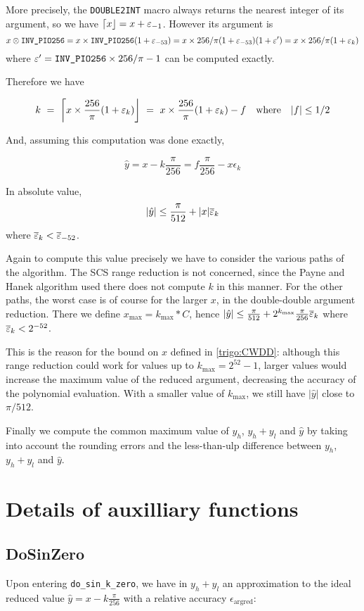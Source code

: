 More precisely, the \texttt{DOUBLE2INT} macro always returns the
nearest integer of its argument, so we have
$\left\lceil x \right\rfloor=x+\varepsilon_{-1}$. However its argument is
$$x\otimes\verb!INV_PIO256! = x \times
\verb!INV_PIO256!(1+\epsilon_{-53}) = x\times
256/\pi(1+\epsilon_{-53})(1+\epsilon')  = x\times
256/\pi(1+\epsilon_k)$$
where $\epsilon'=\verb!INV_PIO256!\times256/\pi-1$ can be
computed exactly.

Therefore we have 

$$k\ =\ \left\lceil x\times \frac{256}{\pi}(1+\varepsilon_k) \right\rfloor
\ =\ x\times \frac{256}{\pi}(1+\varepsilon_k) - f \quad\mbox{where} \quad |f|\le 1/2
$$

And, assuming this computation was done exactly,

$$\hat{y}=x-k\frac{\pi}{256} = f\frac{\pi}{256} - x\epsilon_k$$

In absolute value, $$\left|\hat{y}\right| \le \frac{\pi}{512} +
|x|{\overline{\varepsilon}}_k$$
where ${\overline{\varepsilon}}_k<{\overline{\varepsilon}}_{-52}$.

Again to compute this value precisely we have to consider the various
paths of the algorithm. The SCS range reduction is not concerned,
since the Payne and Hanek algorithm used there does not compute $k$ in
this manner. For the other paths, the worst case is of course for the
larger $x$, in the double-double argument reduction. There we define
$x_{\max} = k_{\max}*C$, hence  $\left|\hat{y}\right|
\le \frac{\pi}{512} + 2^{k_{\max}}\frac{\pi}{256}{\overline{\varepsilon}}_k$ where
${\overline{\varepsilon}}_k<2^{-52}$.


This is the reason for the bound on $x$ defined in \ref{trigo:CWDD}:
although this range reduction could work for values up to
$k_{\max}=2^{52}-1$, larger values would increase the maximum
value of the reduced argument, decreasing the accuracy of the
polynomial evaluation. With a smaller value of $k_{\max}$, we still have
$\left|\hat{y}\right|$ close to $\pi/512$. 

Finally we compute the common maximum value of $y_h$, $y_h+y_l$ and
$\widehat{y}$ by taking into account the rounding errors and the
less-than-ulp difference between $y_h$, $y_h+y_l$ and $\widehat{y}$.
 



\section{Details of auxilliary functions
  \label{trigo:auxilliary}}

\subsection{DoSinZero \label{dosinzero}}
Upon entering  \texttt{do\_sin\_k\_zero}, we have in
$y_h+y_l$ an approximation to the ideal reduced value
$\hat{y}=x-k\frac{\pi}{256}$ with a relative accuracy $\epsilon_{\mathrm{argred}}$:

